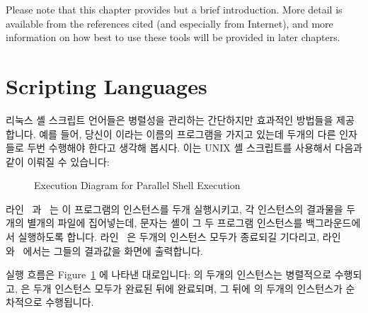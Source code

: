 Please note that this chapter provides but a brief introduction.
More detail is available from the references cited (and especially
from Internet), and more information
on how best to use these tools will be provided in later chapters.
\fi

\section{Scripting Languages}
\label{sec:toolsoftrade:Scripting Languages}

리눅스 셸 스크립트 언어들은 병렬성을 관리하는 간단하지만 효과적인 방법들을
제공합니다.
예를 들어, 당신이  이라는 이름의 프로그램을 가지고 있는데 두개의
다른 인자들로 두번 수행해야 한다고 생각해 봅시다.
이는 UNIX 셸 스크립트를 사용해서 다음과 같이 이뤄질 수 있습니다:

\begin{figure}[tb]
\centering
{}
\caption{Execution Diagram for Parallel Shell Execution}
\label{fig:toolsoftrade:Execution Diagram for Parallel Shell Execution}
\end{figure}

\begin{lineref}
라인~ 과~ 는 이 프로그램의 인스턴스를 두개
실행시키고, 각 인스턴스의 결과물을 두개의 별개의 파일에 집어넣는데, \co{&}
문자는 셸이 그 두 프로그램 인스턴스를 백그라운드에서 실행하도록 합니다.
라인~ 은 두개의 인스턴스 모두가 종료되길 기다리고,
라인~ 와~ 에서는 그들의 결과값을 화면에 출력합니다.
\end{lineref}
실행 흐름은
Figure~\ref{fig:toolsoftrade:Execution Diagram for Parallel Shell Execution}
에 나타낸 대로입니다:
 의 두개의 인스턴스는 병렬적으로 수행되고,  은 두개
인스턴스 모두가 완료된 뒤에 완료되며, 그 뒤에  의 두개의 인스턴스가
순차적으로 수행됩니다.
\iffalse

